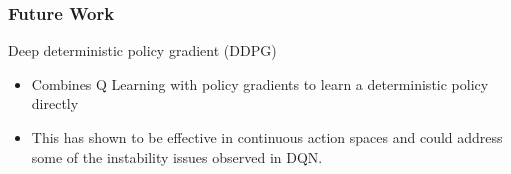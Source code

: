 \documentclass{beamer}
\begin{document}
\begin{frame}
    \frametitle{Future Work}

    Deep deterministic policy gradient (DDPG) \pause
    \begin{itemize}
        \item Combines Q Learning with policy gradients to learn a deterministic policy
              directly \pause
        \item This has shown to be effective in continuous action spaces and could address
              some of the instability issues observed in DQN.
    \end{itemize}

\end{frame}
\end{document}
